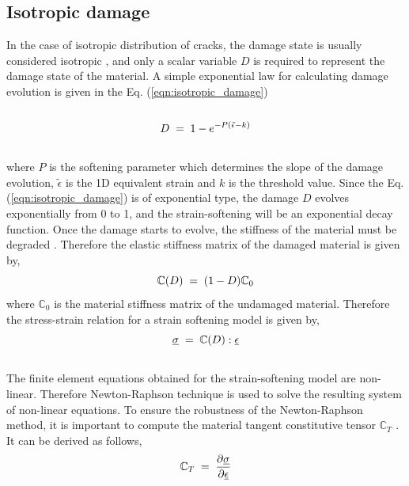 \documentclass[12pt,a4paper,twoside,openright]{report}
\begin{document}
\subsection{Isotropic damage}
\indent\indent\indent In the case of isotropic distribution of cracks, the damage state is usually considered isotropic \citep{lemaitre2012course}, and only a scalar variable $D$ is required to represent the damage state of the material. A simple exponential law for calculating damage evolution is given in the Eq. (\ref{eqn:isotropic_damage}) \citep{peerlings1999enhanced}
\\
\\
\begin{equation}
  \large{ D \; = \; 1 - e^{-P(\tilde{\epsilon} - k)}}
  \label{eqn:isotropic_damage}
\end{equation} 
\\
where $P$ is the softening parameter which determines the slope of the damage evolution, $\tilde{\epsilon}$ is the 1D equivalent strain and $k$ is the threshold value. Since the Eq. (\ref{eqn:isotropic_damage}) is of exponential type, the damage $D$ evolves exponentially from 0 to 1, and the strain-softening will be an exponential decay function. Once the damage starts to evolve, the stiffness of the material must be degraded \citep{murakami2012continuum}. Therefore the elastic stiffness matrix of the damaged material is given by,\\
\begin{equation}
\large{\mathbb{C}(D) \; = \; (1  - D) \mathbb{C}_{0} }
\end{equation} 
where $\mathbb{C}_{0}$ is the material stiffness matrix of the undamaged material. Therefore the stress-strain relation for a strain softening model is given by,\\
\begin{equation}
\large{\underline{\sigma}  \; = \; \mathbb{C}(D) : \underline{ \epsilon} }  
\end{equation}
\\
The finite element equations obtained for the strain-softening model are non-linear. Therefore Newton-Raphson technique is used to solve the resulting system of non-linear equations. To ensure the robustness of the Newton-Raphson method, it is important to compute the material tangent constitutive tensor $\mathbb{C}_{T}$ \citep{lapczyk2007progressive}. It can be derived as follows,\\
\begin{equation*}
\large{ \mathbb{C}_{T}  \; = \;\frac{\partial \underline{\sigma}}{\partial \underline{ \epsilon} }  }
\end{equation*}
\end{document}
